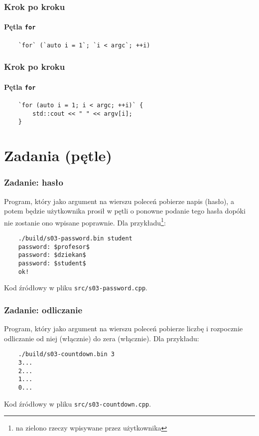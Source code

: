 \documentclass[aspectratio=169]{beamer}
\begin{document}
\begin{frame}[fragile]
    \frametitle{Krok po kroku}
    \framesubtitle{Pętla {\tt for}}

    \begin{lstlisting}
    `for` (`auto i = 1`; `i < argc`; ++i)
    \end{lstlisting}
    \vspace{2.4em}
\end{frame}

\begin{frame}[fragile]
    \frametitle{Krok po kroku}
    \framesubtitle{Pętla {\tt for}}

    \begin{lstlisting}
    `for (auto i = 1; i < argc; ++i)` {
        std::cout << " " << argv[i];
    }
    \end{lstlisting}
\end{frame}

\section{Zadania (pętle)}

\begin{frame}[fragile]
    \frametitle{Zadanie: hasło}
    \label{lecture_exercise_0}

    Program, który jako argument na wierszu poleceń pobierze napis (hasło), a
    potem będzie użytkownika prosił w pętli o ponowne podanie tego hasła dopóki
    nie zostanie ono wpisane poprawnie. Dla przykładu\footnote{{\tiny na zielono
    rzeczy wpisywane przez użytkownika}}:

    \begin{lstlisting}
    ./build/s03-password.bin student
    password: $profesor$
    password: $dziekan$
    password: $student$
    ok!
    \end{lstlisting}

    Kod źródłowy w pliku {\tt src/s03-password.cpp}.
\end{frame}

\begin{frame}[fragile]
    \frametitle{Zadanie: odliczanie}
    \label{lecture_exercise_1}

    Program, który jako argument na wierszu poleceń pobierze liczbę i rozpocznie
    odliczanie od niej (włącznie) do zera (włącznie). Dla przykładu:

    \begin{lstlisting}
    ./build/s03-countdown.bin 3
    3...
    2...
    1...
    0...
    \end{lstlisting}

    Kod źródłowy w pliku {\tt src/s03-countdown.cpp}.
\end{frame}
\end{document}
